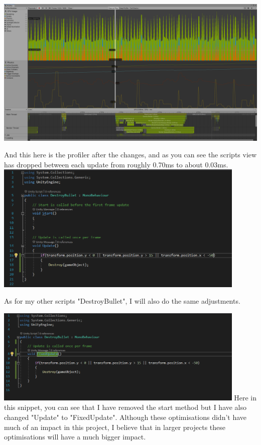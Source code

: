 \documentclass{article}
\begin{document}
\includegraphics[width=15cm]{images/profiler5.png}\par
And this here is the profiler after the changes, and as you can see the scripts view has dropped between each update from roughly 0.70ms to about 0.03ms.
\newpage
\includegraphics[width=12cm]{images/code7.png}\par
As for my other scripts "DestroyBullet", I will also do the same adjustments.

\includegraphics[width=12cm]{images/code6.png}
Here in this snippet, you can see that I have removed the start method but I have also changed "Update" to "FixedUpdate". Although these optimisations didn't have much of an impact in this project, I believe that in larger projects these optimisations will have a much bigger impact.
\end{document}

